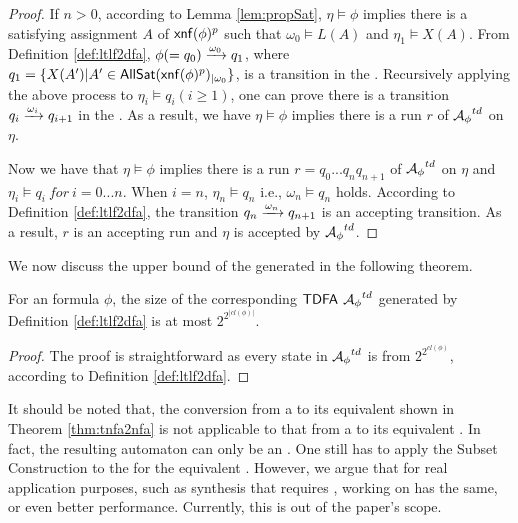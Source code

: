 \begin{proof}
If $n>0$, according to Lemma \ref{lem:propSat}, $\eta\models\phi$ implies there is a satisfying assignment $A$ of ${\sf xnf}(\phi)^p$ such that $\omega_0\models L(A)$ and $\eta_1\models X(A)$. From Definition \ref{def:ltlf2dfa}, $\phi (=q_0)\xrightarrow[]{\omega_0}q_1$, where $q_1=\{X(A') | A'\in{\sf AllSat}({\sf xnf}(\phi)^p)_{|\omega_0}\}$, is a transition in the \TDFA. Recursively applying the above process to $\eta_i\models q_i(i\geq 1)$, one can prove there is a transition $q_i\xrightarrow[]{\omega_i}q_{i+1}$ in the \TDFA. As a result, we have $\eta\models\phi$ implies there is a run $r$ of ${\mathcal{A}_{\phi}}^{td}$ on $\eta$.  

Now we have that $\eta\models\phi$ implies there is a run $r=q_0...q_n q_{n+1}$ of ${\mathcal{A}_{\phi}}^{td}$ on $\eta$ and $\eta_i\models q_i\ for\ i=0...n$. When $i=n$, $\eta_n\models q_n$ i.e., $\omega_n\models q_n$ holds. According to Definition \ref{def:ltlf2dfa}, the transition $q_n\xrightarrow[]{\omega_n}q_{n+1}$ is an accepting transition. As a result, $r$ is an accepting run and $\eta$ is accepted by ${\mathcal{A}_{\phi}}^{td}$.
\end{proof}

We now discuss the upper bound of the generated \TDFA in the following theorem.

\begin{theorem}\label{thm:tdfaBound}
For an \ltlf formula $\phi$, the size of the corresponding ${\sf TDFA}$ ${\mathcal{A}_{\phi}}^{td}$ generated by Definition \ref{def:ltlf2dfa} is at most $2^{2^{|cl(\phi)|}}$.
\end{theorem}
\begin{proof}
	The proof is straightforward as every state in ${\mathcal{A}_{\phi}}^{td}$ is from $2^{2^{cl(\phi)}}$, according to Definition \ref{def:ltlf2dfa}.
\end{proof}

It should be noted that, the conversion from a \TNFA to its equivalent \NFA shown in Theorem \ref{thm:tnfa2nfa} is not applicable to that from a \TDFA to its equivalent \DFA. In fact, the resulting automaton can only be an \NFA. One still has to apply the Subset Construction to the \NFA for the equivalent \DFA. However, we argue that for real application purposes, such as \ltlf synthesis that requires \DFA, working on \TDFA has the same, or even better performance. Currently, this is out of the paper's scope.  

